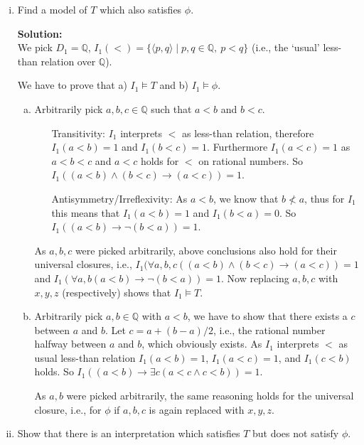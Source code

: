 \documentclass[11pt,a4paper]{uebung}
\newcommand{\solution}[1]{\par {\bf Solution:}\\#1}
\begin{document}
\begin{enumerate}
\begin{enumerate}[(i)]
  \solution{
    Transitivity and a strong form of asymmetry
    (in particular $T$ requires antisymmetry and irreflexivity).
  }

\item
  Find a model of $T$ which also satisfies $\phi$.

  \solution{
    We pick
    $D_1 = \mathbb{Q}$, $I_1(<) = \{ \langle p, q \rangle \mid p, q \in \mathbb{Q},\ p < q \}$
    (i.e., the `usual' less-than relation over $\mathbb{Q}$).

    We have to prove that a) $I_1\models T$ and b) $I_1 \models \phi$.
    \begin{enumerate}[a)]
    \item Arbitrarily pick $a,b,c \in \mathbb{Q}$ such that $a<b$ and $b<c$.
      \begin{itemize}
      \item[Transitivity:] $I_1$ interprets $<$ as less-than relation,
        therefore $I_1(a<b)=1$ and $I_1(b<c)=1$. Furthermore $I_1(a<c)=1$ as
        $a<b<c$ and $a<c$ holds for $<$ on rational numbers.
        So $I_1((a<b) \land (b<c) \rightarrow (a<c))=1$.
      \item[Antisymmetry/Irreflexivity:] As $a<b$, we know that $b \not < a$,
        thus for $I_1$ this means that $I_1(a<b)=1$ and $I_1(b<a)=0$. So
        $I_1((a<b) \rightarrow \neg (b<a))=1$.
      \end{itemize}
      As $a,b,c$ were picked arbitrarily, above conclusions also hold for
      their universal closures, i.e., $I_1(\forall a,b,c ((a<b) \land
      (b<c) \rightarrow (a<c))=1$ and $I_1(\forall a,b (a<b) \rightarrow \neg
      (b<a))=1$. Now replacing $a,b,c$ with $x,y,z$ (respectively) shows that
      $I_1 \models T$.
    \item
      Arbitrarily pick $a,b \in \mathbb{Q}$ with $a<b$, we have to show that there exists
      a $c$ between $a$ and $b$. Let $c=a+(b-a)/2$, i.e., the rational number
      halfway between $a$ and $b$, which obviously exists.
      As $I_1$ interprets $<$ as usual less-than relation $I_1(a<b)=1$,
      $I_1(a<c)=1$, and $I_1(c<b)$ holds. So $I_1((a<b)\rightarrow \exists c(
      a<c \land c<b))=1$.

      As $a,b$ were picked arbitrarily, the same reasoning holds for the
      universal closure, i.e., for $\phi$ if $a,b,c$ is again replaced with
      $x,y,z$.
    \end{enumerate}
  }

\item
  Show that there is an interpretation which satisfies $T$ but does not
  satisfy $\phi$.


\end{enumerate}
\end{enumerate}
\end{document}
